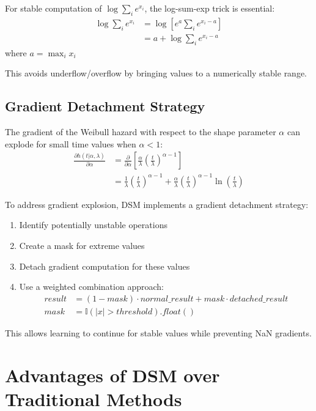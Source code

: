 For stable computation of $\log \sum_i e^{x_i}$, the log-sum-exp trick is essential:
\begin{align}
    \log \sum_i e^{x_i} &= \log \left[ e^a \sum_i e^{x_i - a}\right] \\
    &= a + \log \sum_i e^{x_i - a}
\end{align}
where $a = \max_i x_i$

This avoids underflow/overflow by bringing values to a numerically stable range.

\subsection{Gradient Detachment Strategy}

The gradient of the Weibull hazard with respect to the shape parameter $\alpha$ can explode for small time values when $\alpha < 1$:
\begin{align}
    \frac{\partial h(t|\alpha, \lambda)}{\partial \alpha} &= \frac{\partial}{\partial \alpha}\left[\frac{\alpha}{\lambda}\left(\frac{t}{\lambda}\right)^{\alpha-1}\right] \\
    &= \frac{1}{\lambda}\left(\frac{t}{\lambda}\right)^{\alpha-1} + \frac{\alpha}{\lambda}\left(\frac{t}{\lambda}\right)^{\alpha-1}\ln\left(\frac{t}{\lambda}\right)
\end{align}

To address gradient explosion, DSM implements a gradient detachment strategy:
\begin{enumerate}
    \item Identify potentially unstable operations
    \item Create a mask for extreme values
    \item Detach gradient computation for these values
    \item Use a weighted combination approach:
    \begin{align}
        result &= (1 - mask) \cdot normal\_result + mask \cdot detached\_result \\
        mask &= \mathbb{I}(|x| > threshold).float()
    \end{align}
\end{enumerate}

This allows learning to continue for stable values while preventing NaN gradients.

\section{Advantages of DSM over Traditional Methods}

